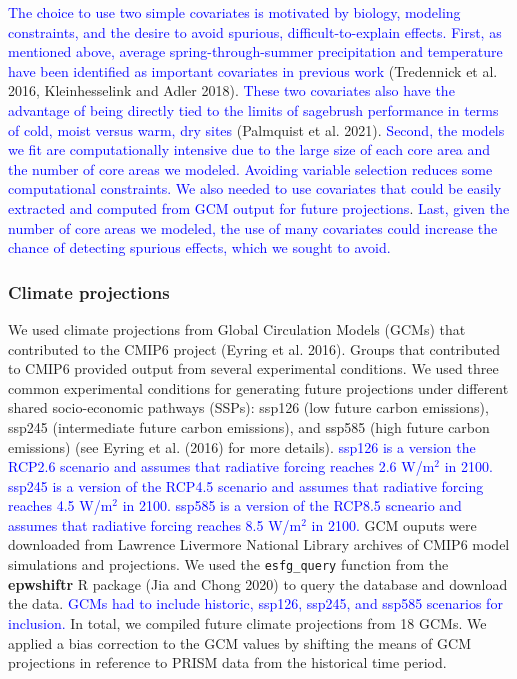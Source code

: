 \documentclass[
  12pt,
]{article}
\begin{document}
\textcolor{blue}{The choice to use two simple covariates is motivated by biology, modeling constraints, and the desire to avoid spurious, difficult-to-explain effects.} \textcolor{blue}{First, as mentioned above, average spring-through-summer precipitation and temperature have been identified as important covariates in previous work} (Tredennick et al. 2016, Kleinhesselink and Adler 2018).
\textcolor{blue}{These two covariates also have the advantage of being directly tied to the limits of sagebrush performance in terms of cold, moist versus warm, dry sites} (Palmquist et al. 2021).
\textcolor{blue}{Second, the models we fit are computationally intensive due to the large size of each core area and the number of core areas we modeled.}
\textcolor{blue}{Avoiding variable selection reduces some computational constraints.}
\textcolor{blue}{We also needed to use covariates that could be easily extracted and computed from GCM output for future projections}.
\textcolor{blue}{Last, given the number of core areas we modeled, the use of many covariates could increase the chance of detecting spurious effects, which we sought to avoid.}

\hypertarget{climate-projections}{%
\subsubsection{Climate projections}\label{climate-projections}}

We used climate projections from Global Circulation Models (GCMs) that contributed to the CMIP6 project (Eyring et al. 2016).
Groups that contributed to CMIP6 provided output from several experimental conditions.
We used three common experimental conditions for generating future projections under different shared socio-economic pathways (SSPs): ssp126 (low future carbon emissions), ssp245 (intermediate future carbon emissions), and ssp585 (high future carbon emissions) (see Eyring et al. (2016) for more details).
\textcolor{blue}{ssp126 is a version the RCP2.6 scenario and assumes that radiative forcing reaches 2.6 W/m$^2$ in 2100.}
\textcolor{blue}{ssp245 is a version of the RCP4.5 scenario and assumes that radiative forcing reaches 4.5 W/m$^2$ in 2100.}
\textcolor{blue}{ssp585 is a version of the RCP8.5 scneario and assumes that radiative forcing reaches 8.5 W/m$^2$ in 2100.}
GCM ouputs were downloaded from Lawrence Livermore National Library archives of CMIP6 model simulations and projections.
We used the \texttt{esfg\_query} function from the \textbf{epwshiftr} R package (Jia and Chong 2020) to query the database and download the data.
\textcolor{blue}{GCMs had to include historic, ssp126, ssp245, and ssp585 scenarios for inclusion.}
In total, we compiled future climate projections from 18 GCMs.
We applied a bias correction to the GCM values by shifting the means of GCM projections in reference to PRISM data from the historical time period.
\end{document}

